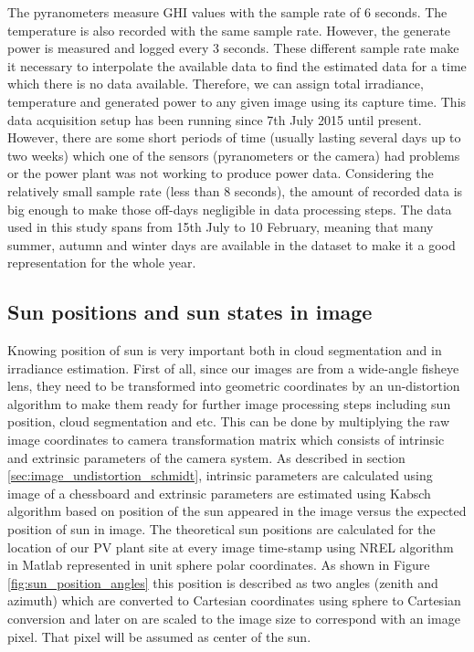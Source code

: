 The pyranometers measure GHI values with the sample rate of 6 seconds. The temperature is also recorded with the  same sample rate. However, the generate power is measured and logged every 3 seconds. These different sample rate make it necessary to interpolate the available data to find the estimated data for a time which there is no data available. Therefore, we can assign total irradiance, temperature and generated power to any given image using its capture time. This data acquisition setup has been running since 7th July 2015 until present. However, there are some short periods of time (usually lasting several days up to two weeks) which one of the sensors (pyranometers or the camera) had problems or the power plant was not working to produce power data. Considering the relatively small sample rate (less than 8 seconds), the amount of recorded data is big enough to make those off-days negligible in data processing steps. The data used in this study spans from 15th July to 10 February, meaning that many summer, autumn and winter days are available in the dataset to make it a good representation for the whole year. 


\subsection{Sun positions and sun states in image}
\label{sec:sun-states}
Knowing position of sun is very important both in cloud segmentation and in irradiance estimation. First of all, since our images are from a wide-angle fisheye lens, they need to be transformed into geometric coordinates by an un-distortion algorithm to make them ready for further image processing steps including sun position, cloud segmentation and etc. This can be done by multiplying the raw image coordinates to camera transformation matrix which consists of intrinsic and extrinsic parameters of the camera system. As described in section \ref{sec:image_undistortion_schmidt}, intrinsic parameters are calculated using image of a chessboard\cite{fisheye_undistort} and extrinsic parameters are estimated using Kabsch algorithm\cite{Kabsch_alg} based on position of the sun appeared in the image versus the expected position of sun in image. The theoretical sun positions are calculated for the location of our PV plant site at every image time-stamp using NREL algorithm \cite{our_sun_position} in Matlab represented in unit sphere polar coordinates. As shown in Figure \ref{fig:sun_position_angles} this position is described as two angles (zenith and azimuth) which are converted to Cartesian coordinates using sphere to Cartesian conversion and later on are scaled to the image size to correspond with an image pixel. That pixel will be assumed as center of the sun.


